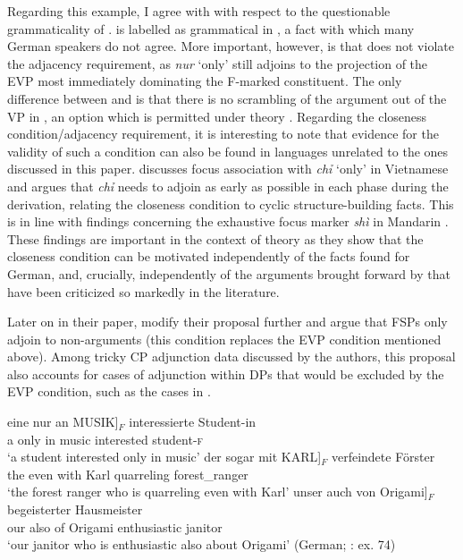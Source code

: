 \documentclass[output=paper,colorlinks,citecolor=brown]{langscibook}
\begin{document}
\noindent Regarding this example, I agree with \citet[230]{Mursell2021} with respect to the questionable grammaticality of .  is labelled as grammatical in \citet{Reis2005}, a fact with which many German speakers do not agree. More important, however, is that  does not violate the adjacency requirement, as \textit{nur} `only' still adjoins to the projection of the EVP most immediately dominating the F-marked constituent. The only difference between  and  is that there is no scrambling of the argument out of the VP in , an option which is permitted under  theory \citep[230]{Mursell2021}. Regarding the closeness condition/adjacency requirement, it is interesting to note that evidence for the validity of such a condition can also be found in languages unrelated to the ones discussed in this paper. \citet{Erlewine2017} discusses focus association with \textit{chỉ} `only' in Vietnamese and argues that \textit{chỉ} needs to adjoin as early as possible in each phase during the derivation, relating the closeness condition to cyclic structure-building facts. This is in line with findings concerning the exhaustive focus marker \textit{shì} in Mandarin \citep{Erlewine2022}. These findings are important in the context of  theory as they show that the closeness condition can be motivated independently of the facts found for German, and, crucially, independently of the arguments brought forward by \citeauthor{BuringHartmann2001} that have been criticized so markedly in the literature. \par 

Later on in their paper, \citet[265-266]{BuringHartmann2001} modify their proposal further and argue that FSPs only adjoin to non-arguments (this condition replaces the EVP condition mentioned above). Among tricky CP adjunction data discussed by the authors, this proposal also accounts for cases of adjunction within DPs that would be excluded by the EVP condition, such as the cases in . 

\ea\label{BuringHartmann:basic4} 
\ea
\gll eine nur an \minsp{[} MUSIK]$_{F}$ interessierte Student-in \\
a only in {} music interested student-\textsc{f}\\
\glt `a student interested only in music’
\ex
\gll der sogar mit \minsp{[} KARL]$_{F}$ verfeindete Förster \\
the even with {} Karl quarreling forest\_ranger \\
\glt `the forest ranger who is quarreling even with Karl’
\ex
\gll unser auch von \minsp{[} Origami]$_{F}$ begeisterter Hausmeister \\
our also of {} Origami enthusiastic janitor \\
\glt `our janitor who is enthusiastic also about Origami’
\z
\hfill (German; \citealt{BuringHartmann2001}: ex. 74) 
\z 
\end{document}

